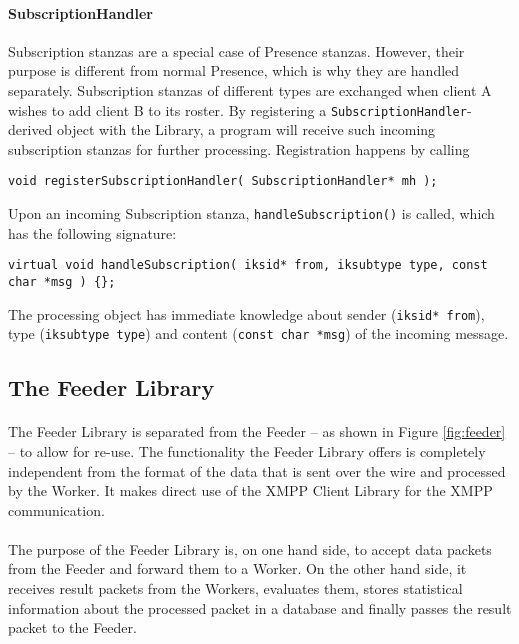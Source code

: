 \paragraph{SubscriptionHandler}
Subscription stanzas are a special case of Presence stanzas. However, their purpose is different from normal Presence, which is why they are handled separately. Subscription stanzas of different types are exchanged when client A wishes to add client B to its roster. By registering a \texttt{SubscriptionHandler}-derived object with the Library, a program will receive such incoming subscription stanzas for further processing. Registration happens by calling
\begin{flushleft}
\texttt{void registerSubscriptionHandler( SubscriptionHandler* mh );}
\end{flushleft}
Upon an incoming Subscription stanza, \texttt{handleSubscription()} is called, which has the following signature:
\begin{flushleft}
\texttt{virtual void handleSubscription( iksid* from, iksubtype type, const char *msg ) \{\};}
\end{flushleft}
The processing object has immediate knowledge about sender (\texttt{iksid* from}), type (\texttt{iksubtype type}) and content (\texttt{const char *msg}) of the incoming message.


\subsection{The Feeder Library}
\label{sec:feederlib}
\paragraph{}
The Feeder Library is separated from the Feeder -- as shown in Figure \ref{fig:feeder} -- to allow for re-use. The functionality the Feeder Library offers is completely independent from the format of the data that is sent over the wire and processed by the Worker. It makes direct use of the XMPP Client Library for the XMPP communication.

\paragraph{}
The purpose of the Feeder Library is, on one hand side, to accept data packets from the Feeder and forward them to a Worker. On the other hand side, it receives result packets from the Workers, evaluates them, stores statistical information about the processed packet in a database and finally passes the result packet to the Feeder.


